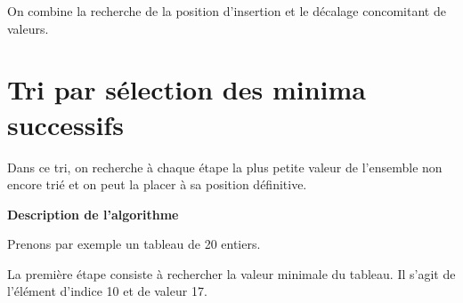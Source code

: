 	On combine la recherche de la position d’insertion et le décalage
	concomitant de valeurs.


	\bigskip


\section{Tri par sélection des minima successifs}
	
	Dans ce tri, on recherche à chaque étape la plus petite valeur de
	l’ensemble non encore trié et on peut la placer à sa position
	définitive.

	{\sffamily\bfseries\upshape
	Description de l’algorithme}

	Prenons par exemple un tableau de 20 entiers. 
	
	La première étape consiste
	à rechercher la valeur minimale du tableau. Il s’agit de l’élément
	d’indice 10 et de valeur 17.
	
